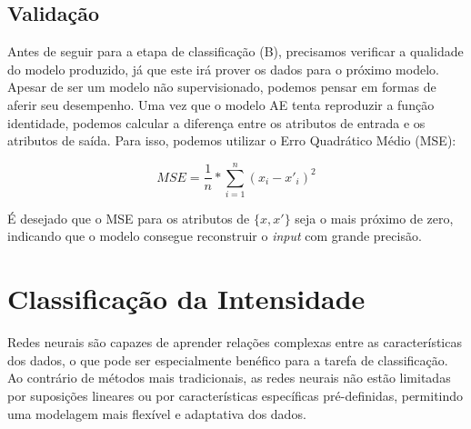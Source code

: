 \subsection{Validação}

Antes de seguir para a etapa de classificação (B), precisamos verificar a qualidade do modelo produzido, já que este irá prover os dados para o próximo modelo. Apesar de ser um modelo não supervisionado, podemos pensar em formas de aferir seu desempenho. Uma vez que o modelo \acrshort{AE} tenta reproduzir a função identidade, podemos calcular a diferença entre os atributos de entrada e os atributos de saída. Para isso, podemos utilizar o Erro Quadrático Médio (\acrshort{MSE}):

\begin{equation}
    MSE = \frac{1}{n} * \sum^n_{i=1} (x_i - x'_i)^2
\end{equation}

É desejado que o \acrshort{MSE} para os atributos de $\{x, x'\}$ seja o mais próximo de zero, indicando que o modelo consegue reconstruir o \textit{input} com grande precisão.


\section{Classificação da Intensidade}




Redes neurais são capazes de aprender relações complexas entre as características dos dados, o que pode ser especialmente benéfico para a tarefa de classificação. Ao contrário de métodos mais tradicionais, as redes neurais não estão limitadas por suposições lineares ou por características específicas pré-definidas, permitindo uma modelagem mais flexível e adaptativa dos dados.

